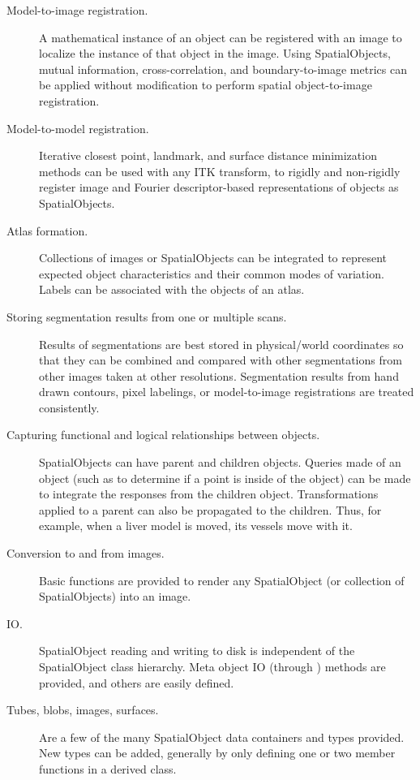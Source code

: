 \begin{description}
  \item[Model-to-image registration.] A mathematical instance of an object
  can be registered with an image to localize the instance of that object in
  the image.  Using SpatialObjects, mutual information, cross-correlation, and
  boundary-to-image metrics can be applied without modification to
  perform spatial object-to-image registration.

  \item[Model-to-model registration.] Iterative closest point, landmark, and
  surface distance minimization methods can be used with any ITK transform,
  to rigidly and non-rigidly register image and Fourier
  descriptor-based representations of objects as SpatialObjects.

  \item[Atlas formation.] Collections of images or SpatialObjects can be
  integrated to represent expected object characteristics and their common
  modes of variation.  Labels can be associated with the objects of an atlas.

  \item[Storing segmentation results from one or multiple scans.] Results of
  segmentations are best stored in physical/world coordinates so that they
  can be combined and compared with other segmentations from other images
  taken at other resolutions.  Segmentation results from hand drawn contours,
  pixel labelings, or model-to-image registrations are treated consistently.

  \item[Capturing functional and logical relationships between objects.]
  SpatialObjects can have parent and children objects.  Queries made of an
  object (such as to determine if a point is inside of the object) can be
  made to integrate the responses from the children object.  Transformations
  applied to a parent can also be propagated to the children.  Thus, for
  example, when a liver model is moved, its vessels move with it.

  \item[Conversion to and from images.] Basic functions are provided to
  render any SpatialObject (or collection of SpatialObjects) into an image.

  \item[IO.] SpatialObject reading and writing to disk is independent of the
  SpatialObject class hierarchy.  Meta object IO (through
  ) methods are provided, and others are easily defined.

  \item[Tubes, blobs, images, surfaces.] Are a few of the many SpatialObject
  data containers and types provided.  New types can be added, generally by
  only defining one or two member functions in a derived class.
\end{description}

